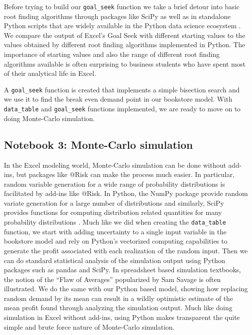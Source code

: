 \documentclass[ited,blindrev]{informs3}              %
\newcommand{\code}[1]{\texttt{#1}}
\begin{document}
Before trying to build our \code{goal\_seek} function we take a brief detour into basic root finding algorithms through packages like SciPy \cite{bibid} as well as in standalone Python scripts that are widely available in the Python data science ecosystem \cite{bibid}. We compare the output of Excel's Goal Seek with different starting values to the values obtained by different root finding algorithms implemented in Python. The importance of starting values and also the range of different root finding algorithms available is often surprising to business students who have spent most of their analytical life in Excel.

A \code{goal\_seek} function is created that implements a simple bisection search and we use it to find the break even demand point in our bookstore model. With \code{data\_table} and \code{goal\_seek} functions implemented, we are ready to move on to doing Monte-Carlo simulation.

\subsection{Notebook 3: Monte-Carlo simulation}

In the Excel modeling world, Monte-Carlo simulation can be done without add-ins, but packages like @Risk \cite{} can make the process much easier. In particular, random variable generation for a wide range of probability distributions is facilitated by add-ins like @Risk. In Python, the NumPy package provide random variate generation for a large number of distributions and similarly, SciPy provides functions for computing distribution related quantities for many probability distributions \cite{}. Much like we did when creating the \code{data\_table} function, we start with adding uncertainty to a single input variable in the bookstore model and rely on Python's vectorized computing capabilities to generate the profit associated with each realization of the random input. Then we can do standard statistical analysis of the simulation output using Python packages such as pandas and SciPy. In spreadsheet based simulation textbooks, the notion of the ``Flaw of Averages'' popularized by Sam Savage \cite{} is often illustrated. We do the same with our Python based model, showing how replacing random demand by its mean can result in a wildly optimistic estimate of the mean profit found through analyzing the simulation output. Much like doing simulation in Excel without add-ins, using Python makes transparent the quite simple and brute force nature of Monte-Carlo simulation.
\end{document}
